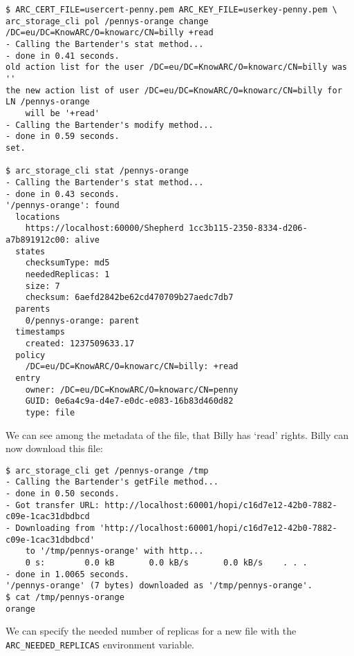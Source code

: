 \documentclass{book}
\begin{document}
\begin{verbatim}
$ ARC_CERT_FILE=usercert-penny.pem ARC_KEY_FILE=userkey-penny.pem \
arc_storage_cli pol /pennys-orange change /DC=eu/DC=KnowARC/O=knowarc/CN=billy +read
- Calling the Bartender's stat method...
- done in 0.41 seconds.
old action list for the user /DC=eu/DC=KnowARC/O=knowarc/CN=billy was ''
the new action list of user /DC=eu/DC=KnowARC/O=knowarc/CN=billy for LN /pennys-orange
    will be '+read'
- Calling the Bartender's modify method...
- done in 0.59 seconds.
set.

$ arc_storage_cli stat /pennys-orange
- Calling the Bartender's stat method...
- done in 0.43 seconds.
'/pennys-orange': found
  locations
    https://localhost:60000/Shepherd 1cc3b115-2350-8334-d206-a7b891912c00: alive
  states
    checksumType: md5
    neededReplicas: 1
    size: 7
    checksum: 6aefd2842be62cd470709b27aedc7db7
  parents
    0/pennys-orange: parent
  timestamps
    created: 1237509633.17
  policy
    /DC=eu/DC=KnowARC/O=knowarc/CN=billy: +read
  entry
    owner: /DC=eu/DC=KnowARC/O=knowarc/CN=penny
    GUID: 0e6a4c9a-d4e7-e0dc-e083-16b83d460d82
    type: file
\end{verbatim}

We can see among the metadata of the file, that Billy has `read' rights. Billy can now download this file:

\begin{verbatim}
$ arc_storage_cli get /pennys-orange /tmp
- Calling the Bartender's getFile method...
- done in 0.50 seconds.
- Got transfer URL: http://localhost:60001/hopi/c16d7e12-42b0-7882-c09e-1cac31dbdbcd
- Downloading from 'http://localhost:60001/hopi/c16d7e12-42b0-7882-c09e-1cac31dbdbcd'
    to '/tmp/pennys-orange' with http...
    0 s:        0.0 kB       0.0 kB/s       0.0 kB/s    . . .       
- done in 1.0065 seconds.
'/pennys-orange' (7 bytes) downloaded as '/tmp/pennys-orange'.
$ cat /tmp/pennys-orange 
orange
\end{verbatim}

We can specify the needed number of replicas for a new file with the \verb!ARC_NEEDED_REPLICAS! environment variable.
\end{document}
